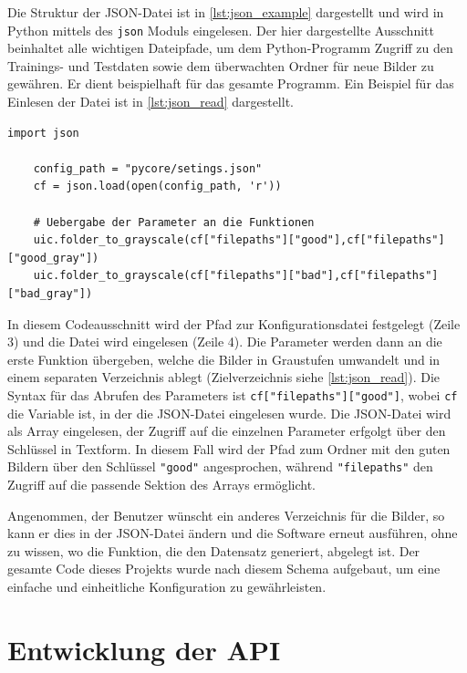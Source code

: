 Die Struktur der \ac{JSON}-Datei ist in \autoref{lst:json_example} dargestellt und wird in Python mittels des \texttt{json} Moduls eingelesen. Der hier dargestellte Ausschnitt beinhaltet alle wichtigen Dateipfade, um dem Python-Programm Zugriff zu den Trainings- und Testdaten sowie dem überwachten Ordner für neue Bilder zu gewähren. Er dient beispielhaft für das gesamte Programm. Ein Beispiel für das Einlesen der Datei ist in \autoref{lst:json_read} dargestellt.

\begin{lstlisting}[style=python, label=lst:json_read, caption={Einlesen der \ac{JSON}-Datei}]
    import json

    config_path = "pycore/setings.json"
    cf = json.load(open(config_path, 'r'))

    # Uebergabe der Parameter an die Funktionen
    uic.folder_to_grayscale(cf["filepaths"]["good"],cf["filepaths"]["good_gray"])
    uic.folder_to_grayscale(cf["filepaths"]["bad"],cf["filepaths"]["bad_gray"])

\end{lstlisting}

In diesem Codeausschnitt wird der Pfad zur Konfigurationsdatei festgelegt (Zeile 3) und die Datei wird eingelesen (Zeile 4). Die Parameter werden dann an die erste Funktion übergeben, welche die Bilder in Graustufen umwandelt und in einem separaten Verzeichnis ablegt (Zielverzeichnis siehe \autoref{lst:json_read}). Die Syntax für das Abrufen des Parameters ist \texttt{cf["filepaths"]["good"]}, wobei \texttt{cf} die Variable ist, in der die \ac{JSON}-Datei eingelesen wurde. Die \ac{JSON}-Datei wird als Array eingelesen, der Zugriff auf die einzelnen Parameter erfgolgt über den Schlüssel in Textform. In diesem Fall wird der Pfad zum Ordner mit den guten Bildern über den Schlüssel \texttt{"good"} angesprochen, während \texttt{"filepaths"} den Zugriff auf die passende Sektion des Arrays ermöglicht.

Angenommen, der Benutzer wünscht ein anderes Verzeichnis für die Bilder, so kann er dies in der \ac{JSON}-Datei ändern und die Software erneut ausführen, ohne zu wissen, wo die Funktion, die den Datensatz generiert, abgelegt ist. 
Der gesamte Code dieses Projekts wurde nach diesem Schema aufgebaut, um eine einfache und einheitliche Konfiguration zu gewährleisten.

\section{Entwicklung der API} \label{subsec:entwicklung_der_api}

